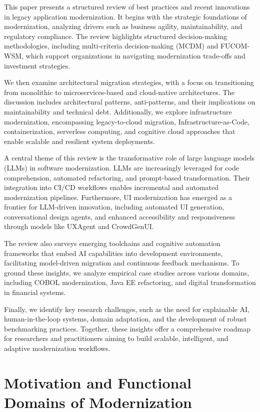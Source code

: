 \documentclass[12pt]{article}
\begin{document}
This paper presents a structured review of best practices and recent innovations in legacy application modernization. It begins with the strategic foundations of modernization, analyzing drivers such as business agility, maintainability, and regulatory compliance. The review highlights structured decision-making methodologies, including multi-criteria decision-making (MCDM) and FUCOM-WSM, which support organizations in navigating modernization trade-offs and investment strategies.

We then examine architectural migration strategies, with a focus on transitioning from monolithic to microservices-based and cloud-native architectures. The discussion includes architectural patterns, anti-patterns, and their implications on maintainability and technical debt. Additionally, we explore infrastructure modernization, encompassing legacy-to-cloud migration, Infrastructure-as-Code, containerization, serverless computing, and cognitive cloud approaches that enable scalable and resilient system deployments.

A central theme of this review is the transformative role of large language models (LLMs) in software modernization. LLMs are increasingly leveraged for code comprehension, automated refactoring, and prompt-based transformation. Their integration into CI/CD workflows enables incremental and automated modernization pipelines. Furthermore, UI modernization has emerged as a frontier for LLM-driven innovation, including automated UI generation, conversational design agents, and enhanced accessibility and responsiveness through models like UXAgent and CrowdGenUI.

The review also surveys emerging toolchains and cognitive automation frameworks that embed AI capabilities into development environments, facilitating model-driven migration and continuous feedback mechanisms. To ground these insights, we analyze empirical case studies across various domains, including COBOL modernization, Java EE refactoring, and digital transformation in financial systems.

Finally, we identify key research challenges, such as the need for explainable AI, human-in-the-loop systems, domain adaptation, and the development of robust benchmarking practices. Together, these insights offer a comprehensive roadmap for researchers and practitioners aiming to build scalable, intelligent, and adaptive modernization workflows.

\section{Motivation and Functional Domains of Modernization}
\end{document}
